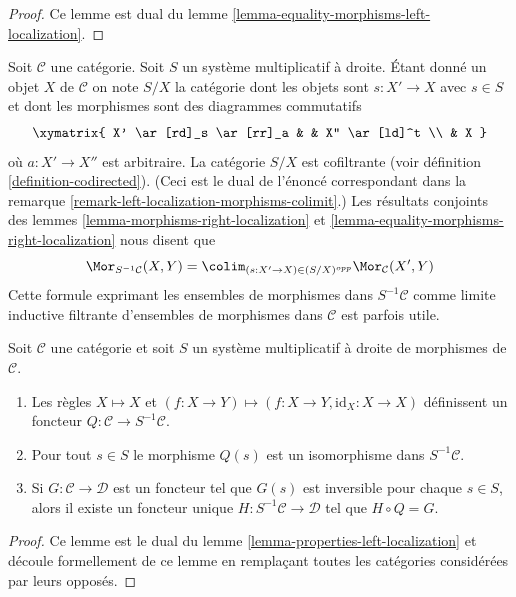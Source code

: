 \begin{proof}
Ce lemme est dual du lemme \ref{lemma-equality-morphisms-left-localization}.
\end{proof}

\begin{remark}
\label{remark-right-localization-morphisms-colimit}
Soit $\mathcal{C}$ une catégorie. Soit $S$ un système multiplicatif à droite.
Étant donné un objet $X$ de $\mathcal{C}$ on note $S/X$ la catégorie dont les
objets sont $s : X' \to X$ avec $s \in S$ et dont les morphismes sont des
diagrammes commutatifs
$$
\xymatrix{
X' \ar[rd]_s \ar[rr]_a & & X'' \ar[ld]^t \\
& X
}
$$
où $a : X' \to X''$ est arbitraire. La catégorie $S/X$ est cofiltrante (voir
définition \ref{definition-codirected}). (Ceci est le dual de l'énoncé
correspondant dans la remarque
\ref{remark-left-localization-morphisms-colimit}.) Les résultats
conjoints des lemmes \ref{lemma-morphisms-right-localization} et
\ref{lemma-equality-morphisms-right-localization} nous disent que
\begin{equation}
\label{equation-right-localization-morphisms-colimit}
\Mor_{S^{-1}\mathcal{C}}(X, Y) =
\colim_{(s : X' \to X) \in (S/X)^{opp}} \Mor_\mathcal{C}(X', Y)
\end{equation}
Cette formule exprimant les ensembles de morphismes dans $S^{-1}\mathcal{C}$
comme limite inductive filtrante d'ensembles de morphismes dans $\mathcal{C}$
est parfois utile.
\end{remark}

\begin{lemma}
\label{lemma-properties-right-localization}
Soit $\mathcal{C}$ une catégorie et soit $S$ un système multiplicatif à droite
de morphismes de $\mathcal{C}$.
\begin{enumerate}
\item Les règles $X \mapsto X$ et $(f : X \to Y) \mapsto (f : X \to Y, \text{id}_X : X \to X)$ définissent un foncteur $Q : \mathcal{C} \to S^{-1}\mathcal{C}$.
\item Pour tout $s \in S$ le morphisme $Q(s)$ est un isomorphisme dans
$S^{-1}\mathcal{C}$.
\item Si $G : \mathcal{C} \to \mathcal{D}$ est un foncteur tel que $G(s)$ est
inversible pour chaque $s \in S$, alors il existe un foncteur unique $H : S^{-1}\mathcal{C} \to \mathcal{D}$ tel que $H \circ Q = G$.
\end{enumerate}
\end{lemma}

\begin{proof}
Ce lemme est le dual du lemme \ref{lemma-properties-left-localization} et
découle formellement de ce lemme en remplaçant toutes les catégories considérées
par leurs opposés.
\end{proof}

